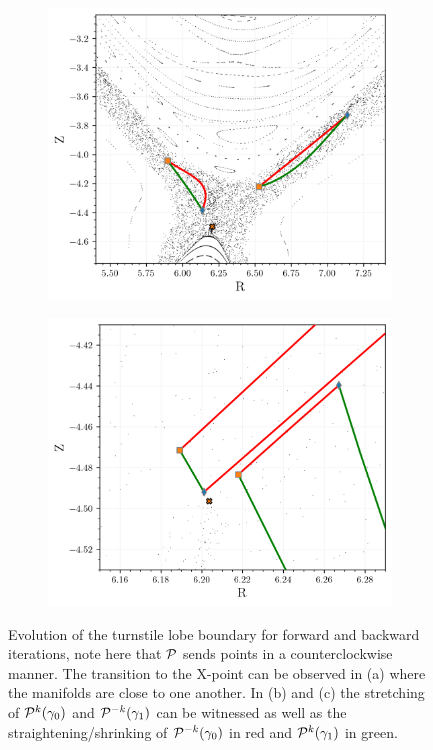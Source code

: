 \begin{figure}[H]
\begin{minipage}[c]{0.42\textwidth}
\begin{subfigure}[b]{0.95\textwidth}
            \includegraphics[width=\textwidth]{images/turnstile/coutour_c1.png}
            \caption{}
            \label{fig:}
        \end{subfigure}
        \vfill
        \vspace{10px}
        \vfill
        \begin{subfigure}[b]{0.95\textwidth}
            \centering
            \includegraphics[width=\textwidth]{images/turnstile/coutour_c2.png}
            \caption{}
            \label{}
        \end{subfigure}
    \end{minipage}%
    \caption{Evolution of the turnstile lobe boundary for forward and backward iterations, note here that $\mathcal{P}$ sends points in a counterclockwise manner. The transition to the X-point can be observed in (a) where the manifolds are close to one another. In (b) and (c) the stretching of $\mathcal{P}^k(\gamma_0)$ and $\mathcal{P}^{-k}(\gamma_1)$ can be witnessed as well as the straightening/shrinking of $\mathcal{P}^{-k}(\gamma_0)$ in red and $\mathcal{P}^{k}(\gamma_1)$ in green.}
    \label{fig:}
\end{figure}


